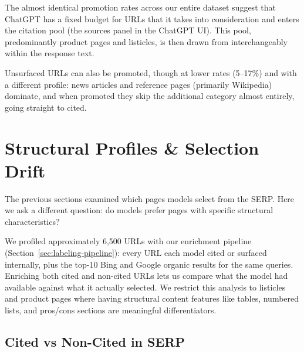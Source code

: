 \noindent The almost identical promotion rates across our entire dataset suggest that
ChatGPT has a fixed budget for URLs that it takes into consideration and enters the citation pool
(the sources panel in the ChatGPT UI).
This pool, predominantly product pages and listicles, is then drawn from interchangeably within the response text.

Unsurfaced URLs can also be promoted, though at lower rates (5--17\%) and with a different profile: news articles and reference pages (primarily Wikipedia) dominate, and when promoted they skip the additional category almost entirely, going straight to cited.

\section{Structural Profiles \& Selection Drift}
\label{sec:content-dna-findings}

The previous sections examined which pages models select from the SERP. Here we ask a different question: do models prefer pages with specific structural characteristics?

We profiled approximately 6{,}500 URLs with our enrichment pipeline (Section~\ref{sec:labeling-pipeline}):
 every URL each model cited or surfaced internally, plus the top-10 Bing and Google organic results for the same queries.
  Enriching both cited and non-cited URLs lets us compare what the model had available against what it 
  actually selected. We restrict this analysis to listicles and product pages where 
  having structural content features like tables, numbered lists, and pros/cons sections are meaningful differentiators.

\subsection{Cited vs Non-Cited in SERP}
\label{sec:selection-drift}
\label{sec:cited-vs-serp}
\label{sec:menu}
\label{sec:order}


